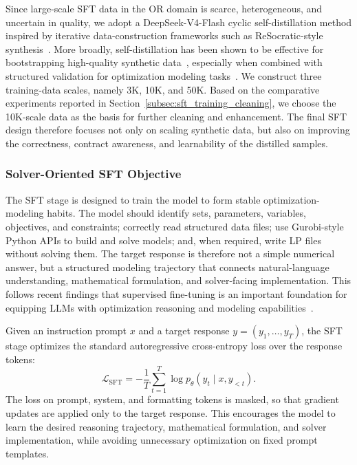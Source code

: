 Since large-scale SFT data in the OR domain is scarce, heterogeneous, and uncertain in quality, we adopt a DeepSeek-V4-Flash cyclic self-distillation method inspired by iterative data-construction frameworks such as ReSocratic-style synthesis~\citep{yang2025optibench,zhang2025scoder}. More broadly, self-distillation has been shown to be effective for bootstrapping high-quality synthetic data~\citep{lee2026self}, especially when combined with structured validation for optimization modeling tasks~\citep{wu2025training}. We construct three training-data scales, namely 3K, 10K, and 50K. Based on the comparative experiments reported in Section~\ref{subsec:sft_training_cleaning}, we choose the 10K-scale data as the basis for further cleaning and enhancement. The final SFT design therefore focuses not only on scaling synthetic data, but also on improving the correctness, contract awareness, and learnability of the distilled samples.

\subsubsection{Solver-Oriented SFT Objective}
\label{subsec:sft_objective}

The SFT stage is designed to train the model to form stable optimization-modeling habits. The model should identify sets, parameters, variables, objectives, and constraints; correctly read structured data files; use Gurobi-style Python APIs to build and solve models; and, when required, write LP files without solving them. The target response is therefore not a simple numerical answer, but a structured modeling trajectory that connects natural-language understanding, mathematical formulation, and solver-facing implementation. This follows recent findings that supervised fine-tuning is an important foundation for equipping LLMs with optimization reasoning and modeling capabilities~\citep{orr1,xiao2026deepor}.

Given an instruction prompt $x$ and a target response $y=(y_1,\ldots,y_T)$, the SFT stage optimizes the standard autoregressive cross-entropy loss over the response tokens:
\begin{equation}
\mathcal{L}_{\mathrm{SFT}}
=
-\frac{1}{T}
\sum_{t=1}^{T}
\log p_{\theta}(y_t \mid x, y_{<t}).
\end{equation}
The loss on prompt, system, and formatting tokens is masked, so that gradient updates are applied only to the target response. This encourages the model to learn the desired reasoning trajectory, mathematical formulation, and solver implementation, while avoiding unnecessary optimization on fixed prompt templates.






